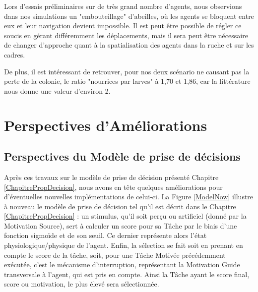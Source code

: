 		 Lors d'essais préliminaires sur de très grand nombre d'agents, nous observions dans nos simulations un "embouteillage" d'abeilles, où les agents se bloquent entre eux et leur navigation devient impossible. Il est peut être possible de régler ce soucis en gérant différemment les déplacements, mais il sera peut être nécessaire de changer d'approche quant à la spatialisation des agents dans la ruche et sur les cadres.
		 
		 De plus, il est intéressant de retrouver, pour nos deux scénario ne causant pas la perte de la colonie, le ratio "nourrices par larves" à 1,70 et 1,86, car la littérature nous donne une valeur d'environ 2.
	
	
	\section{Perspectives d'Améliorations}
	\label{sectionPerspectivesSMA}
	
	\subsection{Perspectives du Modèle de prise de décisions}
	Après ces travaux sur le modèle de prise de décision présenté Chapitre \ref{ChapitrePropDecision}, nous avons en tête quelques améliorations pour d'éventuelles nouvelles implémentations de celui-ci. La Figure \ref{ModelNow} illustre à nouveau le modèle de prise de décision tel qu'il est décrit dans le Chapitre  \ref{ChapitrePropDecision} : un stimulus, qu'il soit perçu ou artificiel (donné par la Motivation Source), sert à calculer un score pour sa Tâche par le biais d'une fonction sigmoïde et de son seuil. Ce dernier représente alors l'état physiologique/physique de l'agent. Enfin, la sélection se fait soit en prenant en compte le score de la tâche, soit, pour une Tâche Motivée précédemment exécutée, c'est le mécanisme d'interruption, représentant la Motivation Guide transversale à l'agent, qui est pris en compte. Ainsi la Tâche ayant le score final, score ou motivation, le plus élevé sera sélectionnée.
	
